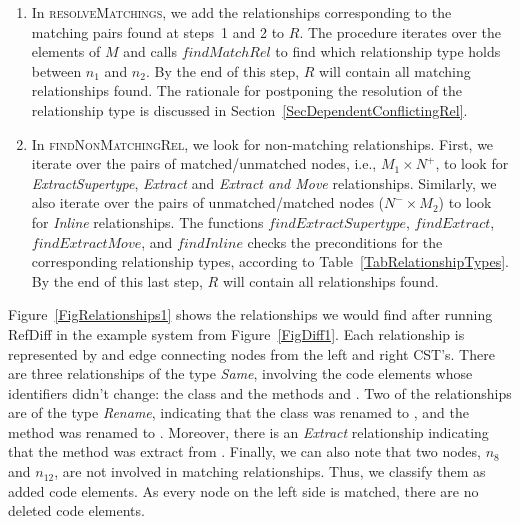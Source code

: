\begin{enumerate}
\item In \textsc{resolveMatchings}, we add the relationships corresponding to the matching pairs found at steps~1 and 2 to $R$.
The procedure iterates over the elements of $M$ and calls $\mathit{findMatchRel}$ to find which relationship type holds between $n_1$ and $n_2$.
By the end of this step, $R$ will contain all matching relationships found.
The rationale for postponing the resolution of the relationship type is discussed in Section~\ref{SecDependentConflictingRel}.

\item In \textsc{findNonMatchingRel}, we look for non-matching relationships.
First, we iterate over the pairs of matched/unmatched nodes, i.e., $M_1 \times N^+$, to look for \textit{ExtractSupertype}, \textit{Extract} and \textit{Extract and Move} relationships.
Similarly, we also iterate over the pairs of unmatched/matched nodes ($N^- \times M_2$) to look for \textit{Inline} relationships.
The functions $findExtractSupertype$, $findExtract$, $findExtractMove$, and $findInline$ checks the  preconditions for the corresponding relationship types, according to Table~\ref{TabRelationshipTypes}.
By the end of this last step, $R$ will contain all relationships found.
\end{enumerate}


Figure~\ref{FigRelationships1} shows the relationships we would find after running RefDiff in the example system from Figure~\ref{FigDiff1}.
Each relationship is represented by and edge connecting nodes from the left and right CST's.
There are three relationships of the type \textit{Same}, involving the code elements whose identifiers didn't change: the class  and the methods  and .
Two of the relationships are of the type \textit{Rename}, indicating that the class  was renamed to , and the method  was renamed to .
Moreover, there is an \textit{Extract} relationship indicating that the method  was extract from .
Finally, we can also note that two nodes, $n_8$ and $n_{12}$, are not involved in matching relationships. Thus, we classify them as added code elements. As every node on the left side is matched, there are no deleted code elements.


